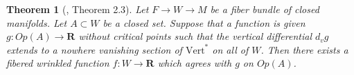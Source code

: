 \documentclass{amsart}
\def\bR{\mathbf{R}}
\newtheorem{theorem}{Theorem}[section]
\newtheorem{corollary}[theorem]{Corollary}
\theoremstyle{definition}
\theoremstyle{remark}
\newtheorem{inductive lemma}[theorem]{Inductive Lemma}
\begin{document}
\begin{theorem}[\cite{EM00}, Theorem 2.3]\label{thm: wrinkling}  Let $F \to W \to M$ be a fiber bundle of closed manifolds. Let $A \subset W$ be a closed set. Suppose that a function is given $g:Op(A) \to \bR$ without critical points such that the vertical differential $d_vg$ extends to a nowhere vanishing section of $\text{Vert}^*$ on all of $W$. Then there exists a fibered wrinkled function $f:W \to \bR$ which agrees with $g$ on $Op(A)$.
\end{theorem}

\end{document}
